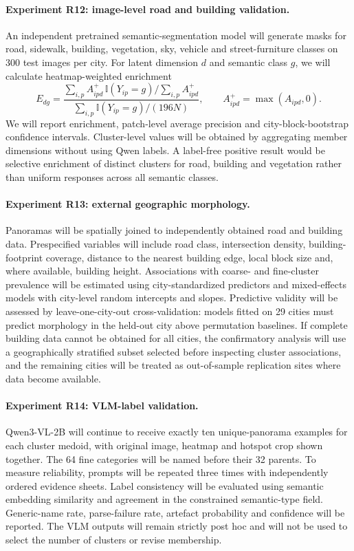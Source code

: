 \paragraph{Experiment R12: image-level road and building validation.}
An independent pretrained semantic-segmentation model will generate masks for
road, sidewalk, building, vegetation, sky, vehicle and street-furniture classes
on 300 test images per city. For latent dimension $d$ and semantic class $g$, we
will calculate heatmap-weighted enrichment
\begin{equation}
  E_{dg}=
  \frac{\sum_{i,p}A^{+}_{ipd}\,\mathbb{I}(Y_{ip}=g)
        /\sum_{i,p}A^{+}_{ipd}}
       {\sum_{i,p}\mathbb{I}(Y_{ip}=g)/(196N)},
  \qquad A^{+}_{ipd}=\max(A_{ipd},0).
  \label{eq:semantic_enrichment}
\end{equation}
We will report enrichment, patch-level average precision and city-block-bootstrap
confidence intervals. Cluster-level values will be obtained by aggregating
member dimensions without using Qwen labels. A label-free positive result would
be selective enrichment of distinct clusters for road, building and vegetation
rather than uniform responses across all semantic classes.

\paragraph{Experiment R13: external geographic morphology.}
Panoramas will be spatially joined to independently obtained road and building
data. Prespecified variables will include road class, intersection density,
building-footprint coverage, distance to the nearest building edge, local block
size and, where available, building height. Associations with coarse- and
fine-cluster prevalence will be estimated using city-standardized predictors and
mixed-effects models with city-level random intercepts and slopes. Predictive
validity will be assessed by leave-one-city-out cross-validation: models fitted
on 29 cities must predict morphology in the held-out city above permutation
baselines. If complete building data cannot be obtained for all cities, the
confirmatory analysis will use a geographically stratified subset selected
before inspecting cluster associations, and the remaining cities will be
treated as out-of-sample replication sites where data become available.

\paragraph{Experiment R14: VLM-label validation.}
Qwen3-VL-2B will continue to receive exactly ten unique-panorama examples for
each cluster medoid, with original image, heatmap and hotspot crop shown
together. The 64 fine categories will be named before their 32 parents. To
measure reliability, prompts will be repeated three times with independently
ordered evidence sheets. Label consistency will be evaluated using semantic
embedding similarity and agreement in the constrained semantic-type field.
Generic-name rate, parse-failure rate, artefact probability and confidence will
be reported. The VLM outputs will remain strictly post hoc and will not be used
to select the number of clusters or revise membership.

